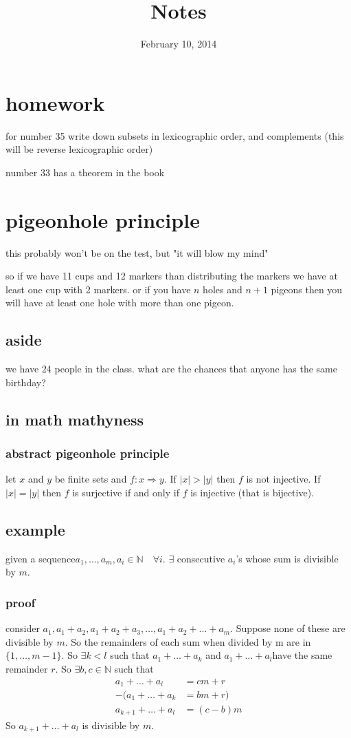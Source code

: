 \documentclass{article}
\begin{document}
\title{Notes}
\date{February 10, 2014}
\maketitle
\section*{homework}
for number 35 write down subsets in lexicographic order, and complements (this will be reverse lexicographic order)

number 33 has a theorem in the book
\section*{pigeonhole principle}
this probably won't be on the test, but "it will blow my mind"

so if we have 11 cups and 12 markers than distributing the markers we have at least one cup with 2 markers. or if you have $n$ holes and $n+1$ pigeons then you will have at least one hole with more than one pigeon.
\subsection*{aside}
we have 24 people in the class. what are the chances that anyone has the same birthday?
\subsection*{in math mathyness}
\subsubsection*{abstract pigeonhole principle}
let $x$ and $y$ be finite sets and $f:x\Rightarrow y$. If $|x|>|y|$ then $f$ is not injective. If $|x|=|y|$ then $f$ is surjective if and only if $f$ is injective (that is bijective).
\subsection*{example}
given a sequence$a_1,\dots,a_m,a_i\in\mathbb{N}\quad \forall i$. $\exists$ consecutive $a_i$'s whose sum is divisible by $m$.
\subsubsection*{proof}
consider $a_1,a_1+a_2,a_1+a_2+a_3,\dots,a_1+a_2+\dots+a_m$. Suppose none of these are divisible by $m$. So the remainders of each sum when divided by m are in $\{1,\dots,m-1\}$. So $\exists k<l$ such that $a_1+\dots+a_k$ and $a_1+\dots+a_l$have the same remainder $r$. So $\exists b,c\in\mathbb{N}$ such that
\begin{align*}
  a_1+\dots+a_l&=cm+r\\
  -(a_1+\dots+a_k&=bm+r)\\
  a_{k+1}+\dots+a_l&=(c-b)m
\end{align*}
So $a_{k+1}+\dots+a_l$ is divisible by $m$.
\end{document}
